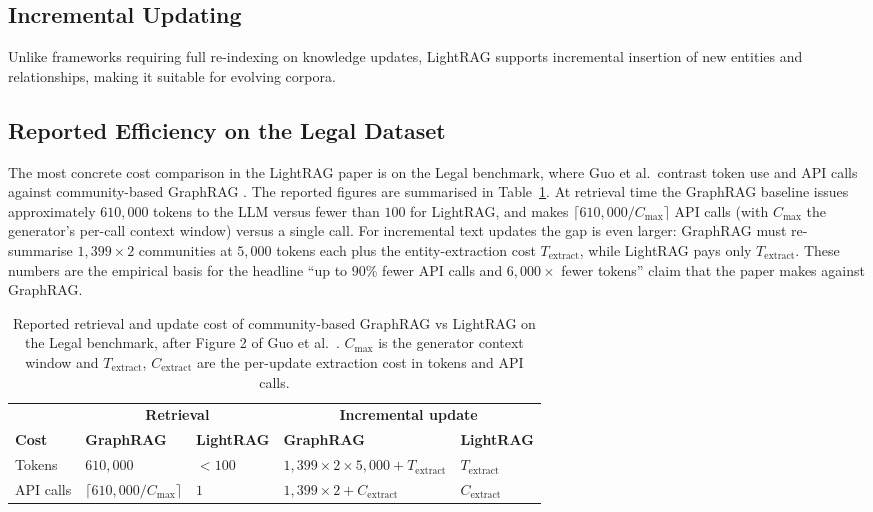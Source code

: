 \documentclass[12pt,a4paper,oneside]{report}
\begin{document}
\subsection{Incremental Updating}
Unlike frameworks requiring full re-indexing on knowledge updates, LightRAG
supports incremental insertion of new entities and relationships, making it
suitable for evolving corpora.

\subsection{Reported Efficiency on the Legal Dataset}
\label{sec:lightrag_legal}

The most concrete cost comparison in the LightRAG paper is on the Legal
benchmark, where Guo et al.\ contrast token use and API calls
against community-based GraphRAG \citep{guo2025lightrag,
edge2024}. The reported figures are summarised in
Table~\ref{tab:lightrag_legal}. At retrieval time the GraphRAG
baseline issues approximately $610{,}000$ tokens to the LLM versus
fewer than $100$ for LightRAG, and makes
$\lceil 610{,}000 / C_{\max} \rceil$ API calls (with $C_{\max}$ the
generator's per-call context window) versus a single call. For
incremental text updates the gap is even larger: GraphRAG must
re-summarise $1{,}399 \times 2$ communities at $5{,}000$ tokens each
plus the entity-extraction cost $T_{\mathrm{extract}}$, while
LightRAG pays only $T_{\mathrm{extract}}$. These numbers are the
empirical basis for the headline ``up to $90\%$ fewer API calls and
$6{,}000\times$ fewer tokens'' claim that the paper makes against
GraphRAG.

\begin{table}[htbp]
\centering
\caption{Reported retrieval and update cost of community-based
GraphRAG vs LightRAG on the Legal benchmark, after Figure 2 of
Guo et al.~\citep{guo2025lightrag}. $C_{\max}$ is the generator context window
and $T_{\mathrm{extract}}$, $C_{\mathrm{extract}}$ are the per-update
extraction cost in tokens and API calls.}
\label{tab:lightrag_legal}
\small
\begin{tabularx}{\textwidth}{@{}lXXXX@{}}
\toprule
 & \multicolumn{2}{c}{\textbf{Retrieval}} & \multicolumn{2}{c}{\textbf{Incremental update}} \\
\textbf{Cost} & \textbf{GraphRAG} & \textbf{LightRAG} & \textbf{GraphRAG} & \textbf{LightRAG} \\
\midrule
Tokens     & $610{,}000$               & $<100$ & $1{,}399 \times 2 \times 5{,}000 + T_{\mathrm{extract}}$ & $T_{\mathrm{extract}}$ \\
API calls  & $\lceil 610{,}000 / C_{\max} \rceil$ & $1$    & $1{,}399 \times 2 + C_{\mathrm{extract}}$         & $C_{\mathrm{extract}}$ \\
\bottomrule
\end{tabularx}
\end{table}
\end{document}
